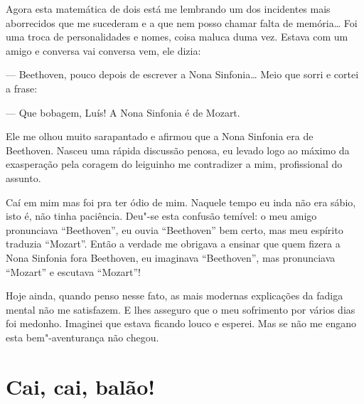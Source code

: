 Agora esta matemática de dois está me lembrando um dos incidentes mais
aborrecidos que me sucederam e a que nem posso chamar falta de
memória\ldots{} Foi uma troca de personalidades e nomes, coisa maluca duma
vez. Estava com um amigo e conversa vai conversa vem, ele dizia:

--- Beethoven, pouco depois de escrever a Nona Sinfonia\ldots{} Meio que
sorri e cortei a frase:

--- Que bobagem, Luís! A Nona Sinfonia é de Mozart.

Ele me olhou muito sarapantado e afirmou que a Nona Sinfonia era de
Beethoven. Nasceu uma rápida discussão penosa, eu levado logo ao máximo
da exasperação pela coragem do leiguinho me contradizer a mim,
profissional do assunto.

Caí em mim mas foi pra ter ódio de mim. Naquele tempo eu inda não era
sábio, isto é, não tinha paciência. Deu"-se esta confusão temível: o meu
amigo pronunciava ``Beethoven'', eu ouvia ``Beethoven'' bem certo, mas meu
espírito traduzia ``Mozart''. Então a verdade me obrigava a ensinar que
quem fizera a Nona Sinfonia fora Beethoven, eu imaginava ``Beethoven'',
mas pronunciava ``Mozart'' e escutava ``Mozart''!

Hoje ainda, quando penso nesse fato, as mais modernas explicações da
fadiga mental não me satisfazem. E lhes asseguro que o meu sofrimento
por vários dias foi medonho. Imaginei que estava ficando louco e
esperei. Mas se não me engano esta bem"-aventurança não chegou.

\chapter{Cai, cai, balão!}

